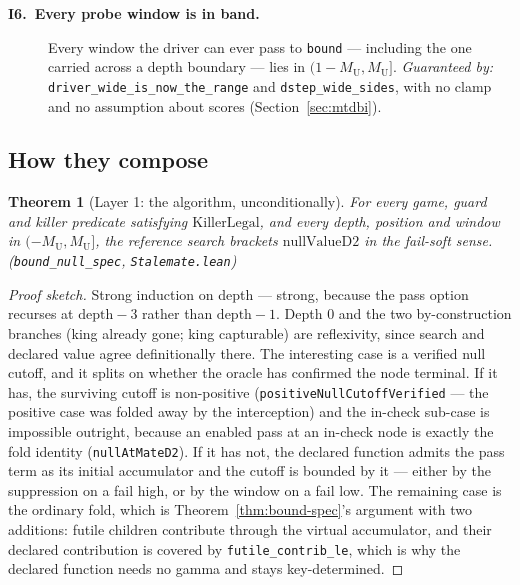 \documentclass[11pt]{article}
\newcommand{\MU}{M_{\mathrm{U}}}    %
\newcommand{\leanref}[2]{(\texttt{#1}, \texttt{#2})}%
\theoremstyle{plain}
\newtheorem{theorem}{Theorem}[section]
\theoremstyle{definition}
\theoremstyle{remark}
\begin{document}
\begin{description}
  \item[\textnormal{\textbf{I6.\ Every probe window is in band.}}]
    Every window the driver can ever pass to \texttt{bound} ---
    including the one carried across a depth boundary --- lies in
    $(1-\MU, \MU]$.
    \emph{Guaranteed by:} \texttt{driver\_wide\_is\_now\_the\_range}
    and \texttt{dstep\_wide\_sides}, with no clamp and no assumption
    about scores (Section~\ref{sec:mtdbi}).
\end{description}

\subsection{How they compose}

\begin{theorem}[Layer 1: the algorithm, unconditionally]
\label{thm:layer1}
For every game, guard and killer predicate satisfying
$\mathrm{KillerLegal}$, and every depth, position and window in
$(-\MU, \MU]$, the reference search brackets $\mathrm{nullValueD2}$ in
the fail-soft sense.
\leanref{bound\_null\_spec}{Stalemate.lean}
\end{theorem}

\begin{proof}[Proof sketch]
Strong induction on depth --- strong, because the pass option recurses
at $\mathrm{depth} - 3$ rather than $\mathrm{depth}-1$.  Depth 0 and
the two by-construction branches (king already gone; king capturable)
are reflexivity, since search and declared value agree definitionally
there.  The interesting case is a verified null cutoff, and it splits
on whether the oracle has confirmed the node terminal.  If it has, the
surviving cutoff is non-positive (\texttt{positiveNullCutoffVerified}
--- the positive case was folded away by the interception) and the
in-check sub-case is impossible outright, because an enabled pass at an
in-check node is exactly the fold identity (\texttt{nullAtMateD2}).  If
it has not, the declared function admits the pass term as its initial
accumulator and the cutoff is bounded by it --- either by the
suppression on a fail high, or by the window on a fail low.  The
remaining case is the ordinary fold, which is
Theorem~\ref{thm:bound-spec}'s argument with two additions: futile
children contribute through the virtual accumulator, and their declared
contribution is covered by \texttt{futile\_contrib\_le}, which is why
the declared function needs no gamma and stays key-determined.
\end{proof}
\end{document}
